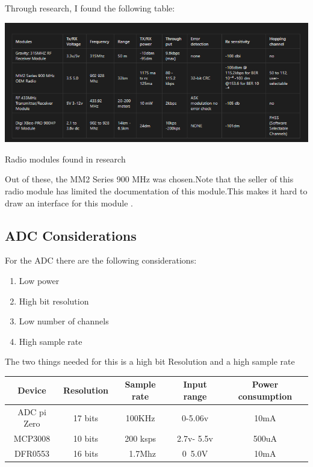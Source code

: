 Through research, I found the following table:
\begin{table}[h!]
	\centering
	\includegraphics[width=0.5\linewidth]{Images/radiomoudles.png}
		
	\caption{Radio modules found in research}
	\label{Radio modules found in research}
	
\end{table}

Out of these, the MM2 Series 900 MHz\cite{freewave} was chosen.Note that the seller of this  radio module has  limited the documentation  of this module.This makes it hard to  draw an interface for this module .
\subsection{ADC Considerations}
\label{Adc section}
For the ADC  there are the following considerations:
\begin{enumerate}
	\item Low power
	\item High bit resolution
	\item Low number of channels
	\item High sample rate
\end{enumerate}
The two things needed for this is a high bit  Resolution  and  a  high sample rate
\begin{table}[h!]
	\begin{center}
		\begin{tabular}{|c|c|c|c|c|}
			\hline
			Device & Resolution & Sample rate & Input range & Power consumption \\
			\hline
			ADC pi Zero & 17 bits & 100KHz & 0-5.06v & 10mA \\
			MCP3008 & 10 bits & 200 ksps & 2.7v- 5.5v & 500uA \\
			DFR0553 & 16 bits & ~1.7Mhz & 0~5.0V&10mA\\
			\hline
		\end{tabular}
	\end{center}
\end{table}

